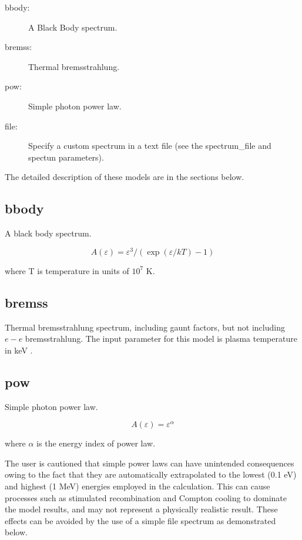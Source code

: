 \begin{description}
	\item[bbody:]  A Black Body spectrum.

	\item[bremss:] Thermal bremsstrahlung.

	\item[pow:]  Simple photon power law.

	\item[file:]  Specify a custom spectrum in a text file (see the 
	spectrum\_file and spectun parameters).
	
\end{description}

The detailed description of these models are in the sections below.

\subsection{bbody}

A black body spectrum.

\begin{equation}
	A(\varepsilon) =  \varepsilon^3 / (\exp(\varepsilon/kT)-1)
\end{equation}

where T is temperature  in units of $10^7$ K.

\subsection{bremss}

Thermal bremsstrahlung spectrum, including gaunt factors, but not including
$e-e$ bremsstrahlung.  The input parameter for this model is
plasma temperature in keV .

\subsection{pow}

Simple photon power law.

\begin{equation}
	A(\varepsilon) = \varepsilon^{\alpha}
\end{equation}

where $\alpha$ is the energy index of power law.

The user is cautioned that simple power laws can have unintended consequences 
owing to the fact that they are automatically extrapolated to the lowest
(0.1 eV) and highest (1 MeV) energies employed in the calculation.  This 
can cause processes such as stimulated recombination and Compton cooling to 
dominate the model results, and may not represent a physically realistic result.
These effects can be avoided by the use of a simple file spectrum as 
demonstrated below.

